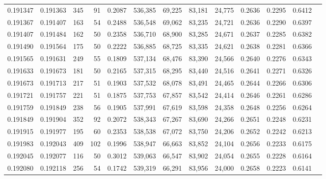 \begin{tabular}{rrrrrrrrrrrrr}
0.191347 & 0.191363 &   345 &  91 &                                     0.2087 & 536,385 &  69,225 &  83,181 &  24,775 & 0.2636 & 0.2295 & 0.6412 \\
0.191367 & 0.191407 &   163 &  54 &                                     0.2488 & 536,548 &  69,062 &  83,235 &  24,721 & 0.2636 & 0.2290 & 0.6397 \\
0.191407 & 0.191484 &   162 &  50 &                                     0.2358 & 536,710 &  68,900 &  83,285 &  24,671 & 0.2637 & 0.2285 & 0.6382 \\
0.191490 & 0.191564 &   175 &  50 &                                     0.2222 & 536,885 &  68,725 &  83,335 &  24,621 & 0.2638 & 0.2281 & 0.6366 \\
0.191565 & 0.191631 &   249 &  55 &                                     0.1809 & 537,134 &  68,476 &  83,390 &  24,566 & 0.2640 & 0.2276 & 0.6343 \\
0.191633 & 0.191673 &   181 &  50 &                                     0.2165 & 537,315 &  68,295 &  83,440 &  24,516 & 0.2641 & 0.2271 & 0.6326 \\
0.191673 & 0.191713 &   217 &  51 &                                     0.1903 & 537,532 &  68,078 &  83,491 &  24,465 & 0.2644 & 0.2266 & 0.6306 \\
0.191721 & 0.191757 &   221 &  51 &                                     0.1875 & 537,753 &  67,857 &  83,542 &  24,414 & 0.2646 & 0.2261 & 0.6286 \\
0.191759 & 0.191849 &   238 &  56 &                                     0.1905 & 537,991 &  67,619 &  83,598 &  24,358 & 0.2648 & 0.2256 & 0.6264 \\
0.191849 & 0.191904 &   352 &  92 &                                     0.2072 & 538,343 &  67,267 &  83,690 &  24,266 & 0.2651 & 0.2248 & 0.6231 \\
0.191915 & 0.191977 &   195 &  60 &                                     0.2353 & 538,538 &  67,072 &  83,750 &  24,206 & 0.2652 & 0.2242 & 0.6213 \\
0.191983 & 0.192043 &   409 & 102 &                                     0.1996 & 538,947 &  66,663 &  83,852 &  24,104 & 0.2656 & 0.2233 & 0.6175 \\
0.192045 & 0.192077 &   116 &  50 &                                     0.3012 & 539,063 &  66,547 &  83,902 &  24,054 & 0.2655 & 0.2228 & 0.6164 \\
0.192080 & 0.192118 &   256 &  54 &                                     0.1742 & 539,319 &  66,291 &  83,956 &  24,000 & 0.2658 & 0.2223 & 0.6141 \\

\end{tabular}
